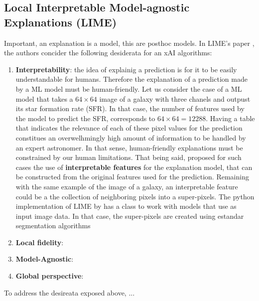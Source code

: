 \subsection{Local Interpretable Model-agnostic Explanations (LIME)}


Important, an explanation is a model, this are posthoc models.
In LIME's paper \citep{ribeiro2016}, the authors concider the following desiderata for an xAI algorithms:

\begin{enumerate}

  \item \textbf{Interpretability}: the idea of explainig a prediction is for it to be easily understandable for humans. Therefore the explanation of a prediction made by a ML model must be human-friendly. Let us consider the case of a ML model that takes a $64 \times 64$ image of a galaxy with three chanels and outpust its star formation rate (SFR). In that case, the number of features used by the model to predict the SFR, corresponds to $64 \times 64 = 12288$. Having a table that indicates the relevance of each of these pixel values for the prediction constitues an overwelhmingly high amount of information to be handled by an expert astronomer. In that sense, human-friendly explanations must be constrained by our human limitations. That being said, \cite{ribeiro2016} proposed for such cases the use of \textbf{interpretable features} for the explanation model, that can be constructed from the original features used for the prediction. Remaining with the same example of the image of a galaxy, an interpretable feature could be a the collection of neighboring pixels into a super-pixels. The python implementation of LIME by \cite{ribeiro2016} has a class to work with models that use as input image data. In that case, the super-pixels are created using estandar segmentation algorithms 
  
  \item \textbf{Local fidelity}:
  
  \item \textbf{Model-Agnostic}:
  
  \item \textbf{Global perspective}:
  
\end{enumerate}

To address the desireata exposed above, \cite{ribeiro2016}...


